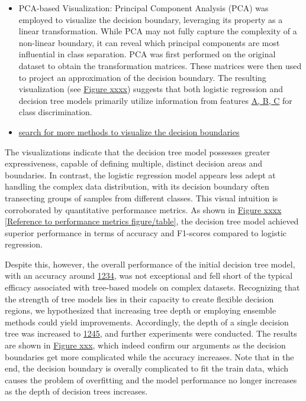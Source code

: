 \documentclass{article}
\begin{document}
\begin{itemize}
\item PCA-based Visualization: Principal Component Analysis (PCA) was employed to visualize the decision boundary, leveraging its property as a linear transformation. While PCA may not fully capture the complexity of a non-linear boundary, it can reveal which principal components are most influential in class separation. PCA was first performed on the original dataset to obtain the transformation matrices. These matrices were then used to project an approximation of the decision boundary. The resulting visualization (see \underline{Figure xxxx}) suggests that both logistic regression and decision tree models primarily utilize information from features \underline{A, B, C} for class discrimination.
\item \underline{search for more methods to visualize the decision boundaries}
\end{itemize}

The visualizations indicate that the decision tree model possesses greater expressiveness, capable of defining multiple, distinct decision areas and boundaries. In contrast, the logistic regression model appears less adept at handling the complex data distribution, with its decision boundary often transecting groups of samples from different classes. This visual intuition is corroborated by quantitative performance metrics. As shown in \underline{Figure xxxx [Reference to performance metrics figure/table]}, the decision tree model achieved superior performance in terms of accuracy and F1-scores compared to logistic regression.

Despite this, however, the overall performance of the initial decision tree model, with an accuracy around \underline{1234}, was not exceptional and fell short of the typical efficacy associated with tree-based models on complex datasets. Recognizing that the strength of tree models lies in their capacity to create flexible decision regions, we hypothesized that increasing tree depth or employing ensemble methods could yield improvements. Accordingly, the depth of a single decision tree was increased to \underline{1245}, and further experiments were conducted. The results are shown in \underline{Figure xxx}, which indeed confirm our arguments as the decision boundaries get more complicated while the accuracy increases. Note that in the end, the decision boundary is overally complicated to fit the train data, which causes the problem of overfitting and the model performance no longer increases as the depth of decision trees increases.
\end{document}
